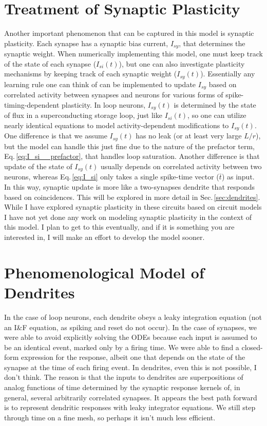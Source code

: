 \documentclass[]{article}
\begin{document}
\section{\label{sec:synaptic_plasticity}Treatment of Synaptic Plasticity}
Another important phenomenon that can be captured in this model is synaptic plasticity. Each synapse has a synaptic bias current, $I_{sy}$, that determines the synaptic weight. When numerically implementing this model, one must keep track of the state of each synapse ($I_{si}(t)$), but one can also investigate plasticity mechanisms by keeping track of each synaptic weight ($I_{sy}(t)$). Essentially any learning rule one can think of can be implemented to update $I_{sy}$ based on correlated activity between synapses and neurons for various forms of spike-timing-dependent plasticity. In loop neurons, $I_{sy}(t)$ is determined by the state of flux in a superconducting storage loop, just like $I_{si}(t)$, so one can utilize nearly identical equations to model activity-dependent modifications to $I_{sy}(t)$. One difference is that we assume $I_{sy}(t)$ has no leak (or at least very large $L/r$), but the model can handle this just fine due to the nature of the prefactor term, Eq.\,\ref{eq:I_si__prefactor}, that handles loop saturation. Another difference is that update of the state of $I_{sy}(t)$ usually depends on correlated activity between two neurons, whereas Eq.\,\ref{eq:I_si} only takes a single spike-time vector ($\bar{t}$) as input. In this way, synaptic update is more like a two-synapses dendrite that responds based on coincidences. This will be explored in more detail in Sec.\,\ref{sec:dendrites}. While I have explored synaptic plasticity in these circuits based on circuit models \cite{sh2018,sh2019_jap} I have not yet done any work on modeling synaptic plasticity in the context of this model. I plan to get to this eventually, and if it is something you are interested in, I will make an effort to develop the model sooner.

\section{\label{sec:dendrites}Phenomenological Model of Dendrites}
In the case of loop neurons, each dendrite obeys a leaky integration equation (not an I\&F equation, as spiking and reset do not occur). In the case of synapses, we were able to avoid explicitly solving the ODEs because each input is assumed to be an identical event, marked only by a firing time. We were able to find a closed-form expression for the response, albeit one that depends on the state of the synapse at the time of each firing event. In dendrites, even this is not possible, I don't think. The reason is that the inputs to dendrites are superpositions of analog functions of time determined by the synaptic response kernels of, in general, several arbitrarily correlated synapses. It appears the best path forward is to represent dendritic responses with leaky integrator equations. We still step through time on a fine mesh, so perhaps it isn't much less efficient.
\end{document}
